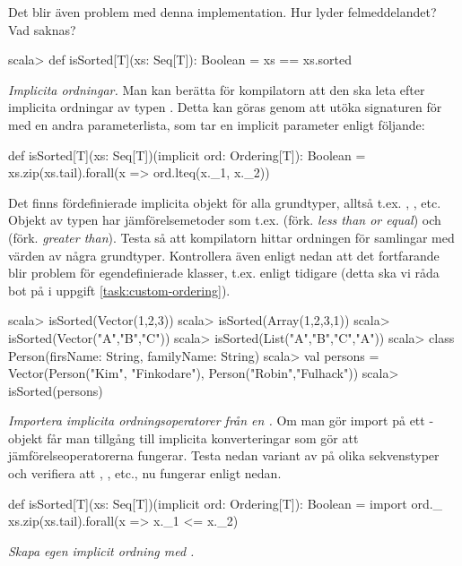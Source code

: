 \Subtask Det blir även problem med denna implementation. Hur lyder felmeddelandet? Vad saknas?
\begin{REPLnonum}
scala> def isSorted[T](xs: Seq[T]): Boolean = xs == xs.sorted          
\end{REPLnonum}
       

\Subtask \emph{Implicita ordningar.} Man kan berätta för kompilatorn att den ska leta efter implicita ordningar av typen  . Detta kan göras genom att utöka signaturen för  med en andra parameterlista, som tar en implicit parameter enligt följande:

\begin{CodeSmall}
def isSorted[T](xs: Seq[T])(implicit ord: Ordering[T]): Boolean =  
  xs.zip(xs.tail).forall(x => ord.lteq(x._1, x._2))
\end{CodeSmall}

Det finns fördefinierade implicita objekt  för alla grundtyper, alltså t.ex. , , etc. Objekt av typen  har jämförelsemetoder som t.ex.  (förk. \emph{less than or equal}) och  (förk. \emph{greater than}).
Testa så att kompilatorn hittar ordningen för samlingar med värden av några grundtyper. Kontrollera även enligt nedan att det fortfarande blir problem för egendefinierade klasser, t.ex.  enligt tidigare (detta ska vi råda bot på i uppgift \ref{task:custom-ordering}).
\begin{REPL}
scala> isSorted(Vector(1,2,3))
scala> isSorted(Array(1,2,3,1))
scala> isSorted(Vector("A","B","C"))
scala> isSorted(List("A","B","C","A"))
scala> class Person(firsName: String, familyName: String)
scala> val persons = Vector(Person("Kim", "Finkodare"), Person("Robin","Fulhack")) 
scala> isSorted(persons)
\end{REPL}

\Subtask \emph{Importera implicita ordningsoperatorer från en .} Om man gör import på ett -objekt får man tillgång till implicita konverteringar som gör att jämförelseoperatorerna fungerar. Testa nedan variant av  på olika sekvenstyper och verifiera att \code{<=}, \code{>}, etc., nu fungerar enligt nedan.
\begin{CodeSmall}
def isSorted[T](xs: Seq[T])(implicit ord: Ordering[T]): Boolean = {  
  import ord._
  xs.zip(xs.tail).forall(x => x._1 <= x._2)
}
\end{CodeSmall}


\Task  \label{task:custom-ordering} \emph{Skapa egen implicit ordning med .}  

